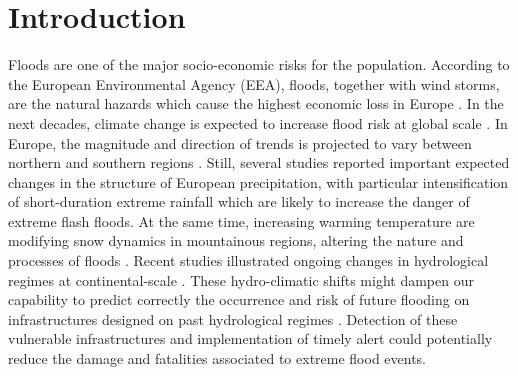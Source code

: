\chapter{Introduction}
\label{chp:introduction}

\newcommand{\keyword}[1]{\textbf{#1}}
\newcommand{\tabhead}[1]{\textbf{#1}}
\newcommand{\code}[1]{\texttt{#1}}
\newcommand{\file}[1]{\texttt{\bfseries#1}}
\newcommand{\option}[1]{\texttt{\itshape#1}}

Floods are one of the major socio-economic risks for the population. According to the European Environmental Agency (EEA), floods, together with wind storms, are the natural hazards which cause the highest economic loss  
in Europe \autocite{european_environment_agency_flood_2013}.
In the next decades, climate change is expected to increase flood risk at global scale \autocite{milly_increasing_2002,hirabayashi_global_2008,hirabayashi_global_2013}. In Europe, the magnitude and direction of trends is projected to vary between northern and southern regions \autocite{dankers_flood_2009,alfieri_global_2015, thober_multi-model_2018}. Still, several studies reported important expected changes in the structure of European precipitation, with particular intensification of short-duration extreme rainfall \autocite{christensen_intensification_2004,zolina_changing_2010,westra_global_2013} which are likely to increase the danger of extreme flash floods. 
At the same time, increasing warming temperature are modifying snow dynamics in mountainous regions, altering the nature and processes of floods \autocite{koplin_seasonality_2014,hall_understanding_2014,berghuijs_precipitation_2014}. 
Recent studies illustrated ongoing changes in hydrological regimes at continental-scale \autocite{bloschl_changing_2017,stahl_filling_2012}.
These hydro-climatic shifts might dampen our capability to predict correctly the occurrence and risk of future flooding on infrastructures designed on past hydrological regimes \autocite{milly_increasing_2002}.
Detection of these vulnerable infrastructures and implementation of timely alert could potentially reduce the damage and fatalities associated to extreme flood events.\\
 
